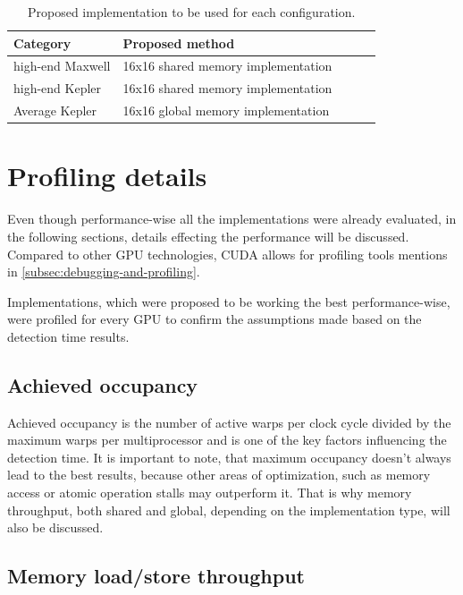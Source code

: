 \begin{table}[htbp]
\label{tab:proposed-methods}
\centering
\begin{tabular}{| l | l | l | l | l |}
\hline
Category & Proposed method \\
\hline
high-end Maxwell & 16x16 shared memory implementation \\
\hline
high-end Kepler & 16x16 shared memory implementation \\
\hline
Average Kepler & 16x16 global memory implementation \\
\hline
\end{tabular}
\caption{Proposed implementation to be used for each configuration.}
\end{table}

\section{Profiling details}

Even though performance-wise all the implementations were already evaluated, in the following sections, details effecting the performance will be discussed. Compared to other GPU technologies, CUDA allows for profiling tools mentions in \ref{subsec:debugging-and-profiling}.

Implementations, which were proposed to be working the best performance-wise, were profiled for every GPU to confirm the assumptions made based on the detection time results.

\subsection{Achieved occupancy}\label{subsec:occupancy}

Achieved occupancy is the number of active warps per clock cycle divided by the maximum warps per multiprocessor and is one of the key factors influencing the detection time. It is important to note, that maximum occupancy doesn't always lead to the best results, because other areas of optimization, such as memory access or atomic operation stalls may outperform it. That is why memory throughput, both shared and global, depending on the implementation type, will also be discussed.

\subsection{Memory load/store throughput}\label{subsec:memory-throughtput}

